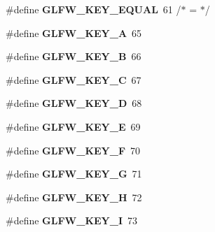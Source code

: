 \begin{DoxyCompactItemize}
\item 
\hypertarget{group__keys_gae1a2de47240d6664423c204bdd91bd17}{\#define {\bfseries \-G\-L\-F\-W\-\_\-\-K\-E\-Y\-\_\-\-E\-Q\-U\-A\-L}~61  /$\ast$ = $\ast$/}\label{group__keys_gae1a2de47240d6664423c204bdd91bd17}

\item 
\hypertarget{group__keys_ga03e842608e1ea323370889d33b8f70ff}{\#define {\bfseries \-G\-L\-F\-W\-\_\-\-K\-E\-Y\-\_\-\-A}~65}\label{group__keys_ga03e842608e1ea323370889d33b8f70ff}

\item 
\hypertarget{group__keys_ga8e3fb647ff3aca9e8dbf14fe66332941}{\#define {\bfseries \-G\-L\-F\-W\-\_\-\-K\-E\-Y\-\_\-\-B}~66}\label{group__keys_ga8e3fb647ff3aca9e8dbf14fe66332941}

\item 
\hypertarget{group__keys_ga00ccf3475d9ee2e679480d540d554669}{\#define {\bfseries \-G\-L\-F\-W\-\_\-\-K\-E\-Y\-\_\-\-C}~67}\label{group__keys_ga00ccf3475d9ee2e679480d540d554669}

\item 
\hypertarget{group__keys_ga011f7cdc9a654da984a2506479606933}{\#define {\bfseries \-G\-L\-F\-W\-\_\-\-K\-E\-Y\-\_\-\-D}~68}\label{group__keys_ga011f7cdc9a654da984a2506479606933}

\item 
\hypertarget{group__keys_gabf48fcc3afbe69349df432b470c96ef2}{\#define {\bfseries \-G\-L\-F\-W\-\_\-\-K\-E\-Y\-\_\-\-E}~69}\label{group__keys_gabf48fcc3afbe69349df432b470c96ef2}

\item 
\hypertarget{group__keys_ga5df402e02aca08444240058fd9b42a55}{\#define {\bfseries \-G\-L\-F\-W\-\_\-\-K\-E\-Y\-\_\-\-F}~70}\label{group__keys_ga5df402e02aca08444240058fd9b42a55}

\item 
\hypertarget{group__keys_gae74ecddf7cc96104ab23989b1cdab536}{\#define {\bfseries \-G\-L\-F\-W\-\_\-\-K\-E\-Y\-\_\-\-G}~71}\label{group__keys_gae74ecddf7cc96104ab23989b1cdab536}

\item 
\hypertarget{group__keys_gad4cc98fc8f35f015d9e2fb94bf136076}{\#define {\bfseries \-G\-L\-F\-W\-\_\-\-K\-E\-Y\-\_\-\-H}~72}\label{group__keys_gad4cc98fc8f35f015d9e2fb94bf136076}

\item 
\hypertarget{group__keys_ga274655c8bfe39742684ca393cf8ed093}{\#define {\bfseries \-G\-L\-F\-W\-\_\-\-K\-E\-Y\-\_\-\-I}~73}\label{group__keys_ga274655c8bfe39742684ca393cf8ed093}


\end{DoxyCompactItemize}
